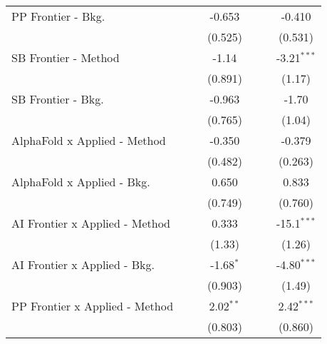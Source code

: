 \begin{tabular}{lcccccc}
   PP Frontier - Bkg.             &               &              & -0.653        &               &             & -0.410\\   
                                  &               &              & (0.525)       &               &             & (0.531)\\   
   SB Frontier - Method           &               &              & -1.14         &               &             & -3.21$^{***}$\\   
                                  &               &              & (0.891)       &               &             & (1.17)\\   
   SB Frontier - Bkg.             &               &              & -0.963        &               &             & -1.70\\   
                                  &               &              & (0.765)       &               &             & (1.04)\\   
   AlphaFold x Applied - Method   &               &              & -0.350        &               &             & -0.379\\   
                                  &               &              & (0.482)       &               &             & (0.263)\\   
   AlphaFold x Applied - Bkg.     &               &              & 0.650         &               &             & 0.833\\   
                                  &               &              & (0.749)       &               &             & (0.760)\\   
   AI Frontier x Applied - Method &               &              & 0.333         &               &             & -15.1$^{***}$\\   
                                  &               &              & (1.33)        &               &             & (1.26)\\   
   AI Frontier x Applied - Bkg.   &               &              & -1.68$^{*}$   &               &             & -4.80$^{***}$\\   
                                  &               &              & (0.903)       &               &             & (1.49)\\   
   PP Frontier x Applied - Method &               &              & 2.02$^{**}$   &               &             & 2.42$^{***}$\\   
                                  &               &              & (0.803)       &               &             & (0.860)\\   

\end{tabular}
